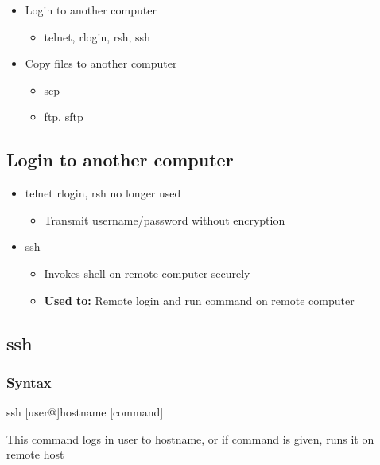 \documentclass{report}
\begin{document}
    \pagebreak 

    \begin{itemize}
        \item Login to another computer 
            \begin{itemize}
                \item telnet, rlogin, rsh, ssh
            \end{itemize}
        \item Copy files to another computer 
            \begin{itemize}
                \item scp
                \item ftp, sftp
            \end{itemize}
    \end{itemize}

    \bigbreak \noindent 
    \subsection{Login to another computer}
    \bigbreak \noindent 
    \begin{itemize}
        \item telnet rlogin, rsh no longer used
            \begin{itemize}
                \item Transmit username/password without encryption
            \end{itemize}
        \item ssh
            \begin{itemize}
                \item Invokes shell on remote computer securely
                \item \textbf{Used to:} Remote login and run command on remote computer
            \end{itemize}
    \end{itemize}

    \bigbreak \noindent 
    \subsection{ssh}

    \bigbreak \noindent 
    \subsubsection{Syntax}
    \begin{bashcode}
        ssh [user@]hostname [command]
    \end{bashcode}
    \bigbreak \noindent 
    This command logs in user to hostname, or if command is given, runs it on remote host 
\end{document}
